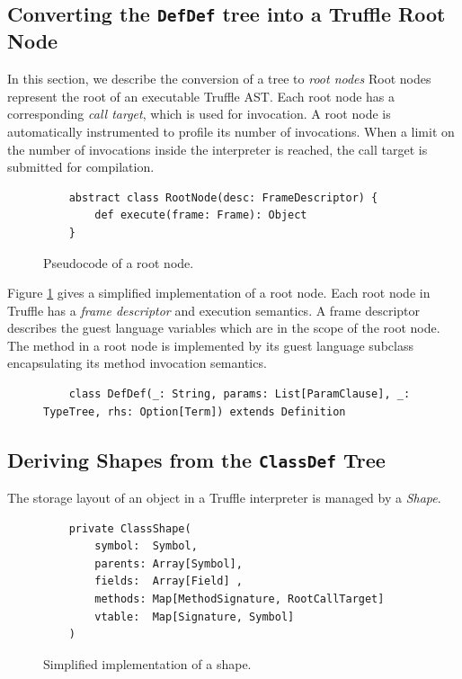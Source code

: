 \subsection{Converting the \texttt{DefDef} tree into a Truffle Root Node}
\label{impl:subsection:defdef}

In this section, we describe the conversion of a  tree to \textit{root nodes}
Root nodes represent the root of an executable Truffle AST.
Each root node has a corresponding \textit{call target}, which is used for invocation.
A root node is automatically instrumented\cite{profiling:atom} to profile its number of invocations. 
When a limit on the number of invocations inside the interpreter is reached, the call target is submitted for compilation.

\begin{figure}[!htb]
	\begin{verbatim}
	abstract class RootNode(desc: FrameDescriptor) {
		def execute(frame: Frame): Object
	}
	\end{verbatim}
	\caption{Pseudocode of a root node.}
	\label{example:root-node}
\end{figure}

Figure \ref{example:root-node} gives a simplified implementation of a root node.
Each root node in Truffle has a \textit{frame descriptor} and execution semantics.
A frame descriptor describes the guest language variables which are in the scope of the root node.
The  method in a root node is implemented by its guest language subclass encapsulating its method invocation semantics.

\begin{figure}
	\begin{verbatim}
	class DefDef(_: String, params: List[ParamClause], _: TypeTree, rhs: Option[Term]) extends Definition	
	\end{verbatim}
\end{figure}

\subsection{Deriving Shapes from the \texttt{ClassDef} Tree}
\label{impl:subsection:classdef}

The storage layout of an object in a Truffle interpreter is managed by a \textit{Shape}.

\begin{figure}[!htb]
	\begin{verbatim}
	private ClassShape(
		symbol:  Symbol,
		parents: Array[Symbol],
		fields:  Array[Field] ,
		methods: Map[MethodSignature, RootCallTarget]
		vtable:  Map[Signature, Symbol]
	)
	\end{verbatim}
	\caption{Simplified implementation of a shape.}
\end{figure}

